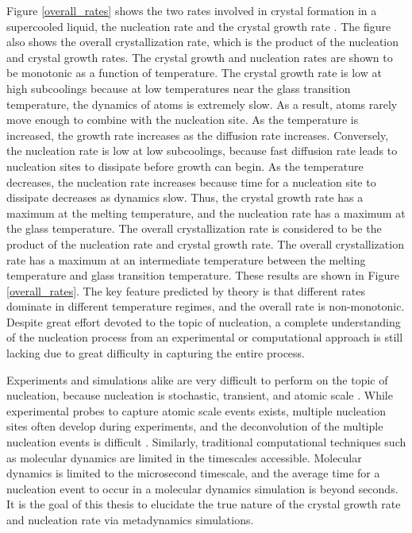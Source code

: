 Figure \ref{overall_rates} shows the two rates involved in crystal formation in a supercooled liquid, the nucleation rate and the crystal growth rate \cite{barrett1973the}.  The figure also shows the overall crystallization rate, which is the product of the nucleation and crystal growth rates.  The crystal growth and nucleation rates are shown to be monotonic as a function of temperature.  The crystal growth rate is low at high subcoolings because at low temperatures near the glass transition temperature, the dynamics of atoms is extremely slow.  As a result, atoms rarely move enough to combine with the nucleation site.  As the temperature is increased, the growth rate increases as the diffusion rate increases.  Conversely, the nucleation rate is low at low subcoolings, because fast diffusion rate leads to nucleation sites to dissipate before growth can begin.  As the temperature decreases, the nucleation rate increases because time for a nucleation site to dissipate decreases as dynamics slow.  Thus, the crystal growth rate has a maximum at the melting temperature, and the nucleation rate has a maximum at the glass temperature.  The overall crystallization rate is considered to be the product of the nucleation rate and crystal growth rate.  The overall crystallization rate has a maximum at an intermediate temperature between the melting temperature and glass transition temperature.  These results are shown in Figure \ref{overall_rates}.   The key feature predicted by theory is that different rates dominate in different temperature regimes, and the overall rate is non-monotonic.  Despite great effort devoted to the topic of nucleation, a complete understanding of the nucleation process from an experimental or computational approach is still lacking due to great difficulty in capturing the entire process.  

Experiments and simulations alike are very difficult to perform on the topic of nucleation, because nucleation is stochastic, transient, and atomic scale \cite{ReintenWolde1996}.  While experimental probes to capture atomic scale events exists, multiple nucleation sites often develop during experiments, and the deconvolution of the multiple nucleation events is difficult \cite{ReintenWolde1996}.  Similarly, traditional computational techniques such as molecular dynamics are limited in the timescales accessible.  Molecular dynamics is limited to the microsecond timescale, and the average time for a nucleation event to occur in a molecular dynamics simulation is beyond seconds.  It is the goal of this thesis to elucidate the true nature of the crystal growth rate and nucleation rate via metadynamics simulations.


